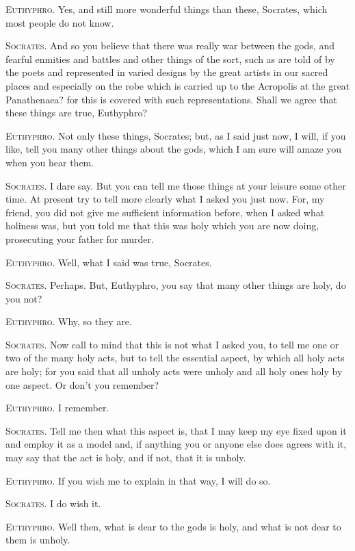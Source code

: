 \textsc{Euthyphro}. Yes, and still more wonderful things than these,
Soc\-ra\-tes, which most people do not know.

\textsc{Socrates}. And so you believe that there was really war
between the gods, and fearful enmities and battles and other things of
the sort, such as are told of by the poets and represented in varied
designs by the great artists in our sacred places and especially on
the robe which is carried up to the Acropolis at the great
Panathenaea? for this is covered with such representations. Shall we
agree that these things are true, Euthyphro?

\textsc{Euthyphro}. Not only these things, Socrates; but, as I said
just now, I will, if you like, tell you many other things about the
gods, which I am sure will amaze you when you hear them.

\textsc{Socrates}. I dare say. But you can tell me those things at
your leisure some other time. At present try to tell more clearly what
I asked you just now. For, my friend, you did not give me sufficient
information before, when I asked what holiness was, but you told me
that this was holy  which you are now doing, prosecuting your
father for murder.

\textsc{Euthyphro}. Well, what I said was true, Socrates.

\textsc{Socrates}. Perhaps. But, Euthyphro, you say that many other
things are holy, do you not?

\textsc{Euthyphro}. Why, so they are.

\textsc{Socrates}. Now call to mind that this is not what I asked you,
to tell me one or two of the many holy acts, but to tell the essential
aspect, by which all holy acts are holy; for you said that all unholy
acts were unholy and all holy ones holy by one aspect. Or don't you
remember?

\textsc{Euthyphro}. I remember.

\textsc{Socrates}. Tell me then what this aspect is, that I may keep
my eye fixed upon it and employ it as a model and, if anything you or
anyone else does agrees with it, may say that the act is holy, and if
not, that it is unholy.

\textsc{Euthyphro}. If you wish me to explain in that way, I will do
so.

\textsc{Socrates}. I do wish it.

\textsc{Euthyphro}. Well then, what is dear to the gods is holy, and
what is not dear to them is unholy.


